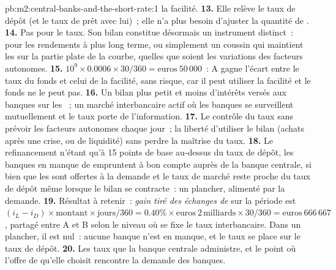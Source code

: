 \begin{solution}{pb:m2:central-banks-and-the-short-rate:1}
la facilité.
\textbf{13.} Elle relève le taux de dépôt (et le taux de prêt avec lui)~; elle n'a plus
besoin d'ajuster la quantité de .
\textbf{14.} Pas pour le taux. Son bilan constitue désormais un
instrument distinct~: pour les rendements à plus long terme, ou simplement un coussin qui maintient les  sur
la partie plate de la courbe, quelles que soient les variations des facteurs autonomes.
\textbf{15.} $10^9 \times 0.0006 \times 30/360 = \text{euros}~50\,000$~: A gagne
l'écart entre le taux du fonds et celui de la facilité, sans risque, car il
peut utiliser la facilité et le fonds ne le peut pas.
\textbf{16.} Un bilan plus petit et moins d'intérêts versés aux banques sur
les ~; un marché interbancaire actif où les banques se surveillent mutuellement et
le taux porte de l'information.
\textbf{17.} Le contrôle du taux sans prévoir les facteurs autonomes chaque
jour~; la liberté d'utiliser le bilan (achats après une crise, ou
de liquidité) sans perdre la maîtrise du taux.
\textbf{18.} Le refinancement n'étant qu'à 15 points de base au-dessus du taux de dépôt,
les banques en manque de  empruntent à bon compte auprès de la banque centrale, si bien que les  sont
offertes à la demande et le taux de marché reste proche du taux de dépôt même
lorsque le bilan se contracte~: un plancher, alimenté par la demande.
\textbf{19.} Résultat à retenir~: \emph{gain tiré des échanges de } sur la
période est $(i_L - i_D) \times \text{montant} \times \text{jours}/360 = 0.40\%
\times \text{euros}~2\,\text{milliards} \times 30/360 = \text{euros}~666\,667$,
partagé entre A et B selon le niveau où se fixe le taux interbancaire. Dans un plancher, il
est nul~: aucune banque n'est en manque, et le taux se place sur le taux de dépôt.
\textbf{20.} Les taux que la banque centrale administre, et le point où l'offre
de  qu'elle choisit rencontre la demande des banques.
\end{solution}

